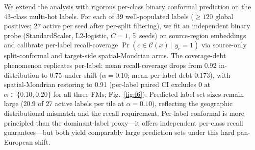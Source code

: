 \documentclass[journal]{IEEEtran}
\renewcommand{\_}{\textunderscore\allowbreak}
\begin{document}
We extend the analysis with rigorous per-class binary conformal
prediction on the 43-class multi-hot labels. For each of 39 well-populated labels ($\ge120$ global
positives; 27 active per seed after per-split filtering), we fit an independent binary probe
(StandardScaler, L2-logistic, $C=1$, 5~seeds) on source-region embeddings and calibrate per-label
recall-coverage $\Pr(c\in\mathcal{C}(x)\mid y_c=1)$ via source-only split-conformal and target-side
spatial-Mondrian arms. The coverage-debt phenomenon replicates per-label: mean recall-coverage drops from
0.92 in-distribution to 0.75 under shift ($\alpha=0.10$; mean per-label debt
0.173), with spatial-Mondrian restoring to 0.91 (per-label paired CI excludes $0$ at
$\alpha\in\{0.10,0.20\}$ for all three FMs; Fig.~\ref{fig:f6}). Predicted-label set sizes remain large
(20.9 of 27 active labels per tile at $\alpha=0.10$), reflecting the geographic
distributional mismatch and the recall requirement. Per-label conformal is more principled than the
dominant-label proxy---it offers independent per-class recall guarantees---but both yield comparably large
prediction sets under this hard pan-European shift.
\end{document}
